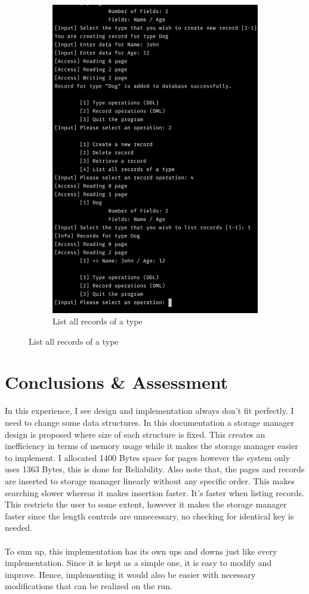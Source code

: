 \documentclass[12pt,a4paper]{article}
\begin{document}
\begin{figure}
\begin{subfigure}{.5\textwidth}
  \includegraphics[width=.90\linewidth]{ss4.jpg}
  \caption{List all records of a type}
  \label{fig:sub4}
\end{subfigure}
\end{figure}

\section{Conclusions \& Assessment}
    In this experience, I see design and implementation always don't fit perfectly. I need to change some data structures.
    In this documentation a storage manager design is proposed where size of each
structure is fixed. This creates an inefficiency in terms of memory usage while
it makes the storage manager easier to implement. I allocated 1400 Bytes space for pages however the system only uses 1363 Bytes, this is done for Reliability.  Also note that, the pages
and records are inserted to storage manager linearly without any specific order. This makes searching slower whereas it makes
insertion faster. It's faster when listing records. \\
    This restricts the user to some extent, however it makes the storage manager
faster since the length controls are unnecessary, no checking for identical key is
needed. \\
    \\
    To sum up, this implementation has its own ups and downs just like every implementation.
    Since it is kept as a simple one, it is easy to modify and improve. Hence,
implementing it would also be easier with necessary modifications that can be
realized on the run.
\end{document}
